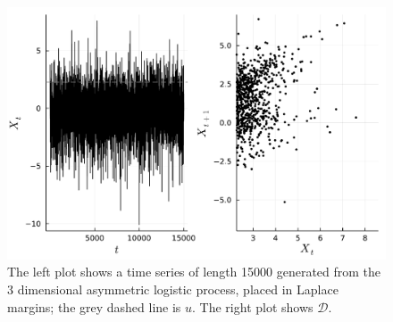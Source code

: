\documentclass[11pt,twoside,openany]{book}
\newcommand{\D}{\mathcal{D}}
\numberwithin{Theorem}{chapter}
\numberwithin{Definition}{chapter}
\numberwithin{Lemma}{chapter}
\numberwithin{Algorithm}{chapter}
\numberwithin{equation}{chapter}
\begin{document}
\begin{figure}[htp]
  \centering
  \includegraphics[scale=0.75]{../ht-em/figures/block_bootstrap_Xs.pdf}
  \caption{The left plot shows a time series of length 15000 generated from
  the 3 dimensional asymmetric logistic process, placed in Laplace margins; the
grey dashed line is $u$. The right plot shows $\D$.}\label{fig:block_bootstrap_Xs}
\end{figure}



\end{document}
